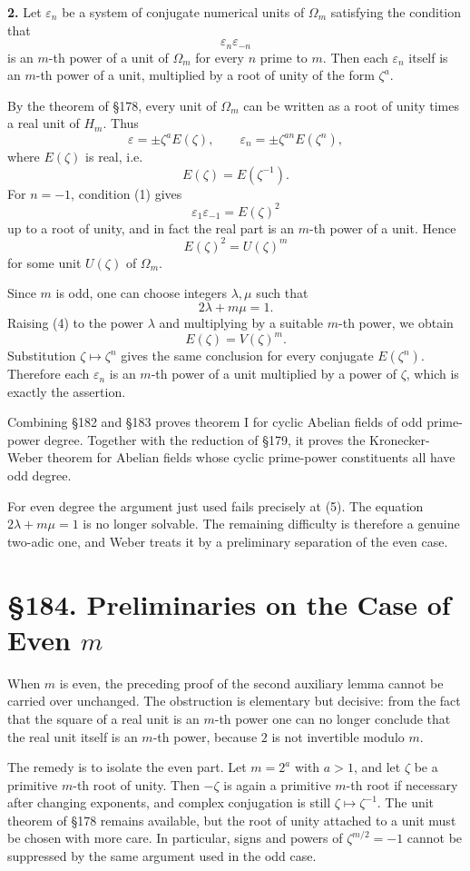 \documentclass[12pt,a4paper]{article}
\newcommand{\webersection}[2]{\clearpage\section*{\S #1. #2}}
\newcommand{\Om}{\Omega_m}
\newcommand{\Hm}{H_m}
\newcommand{\zetaS}{\zeta}
\begin{document}
\textbf{2.} Let \(\varepsilon_n\) be a system of conjugate numerical units of \(\Om\) satisfying the condition that
\[
  \varepsilon_n\varepsilon_{-n}
\tag{1}
\]
is an \(m\)-th power of a unit of \(\Om\) for every \(n\) prime to \(m\).  Then each \(\varepsilon_n\) itself is an \(m\)-th power of a unit, multiplied by a root of unity of the form \(\zetaS^a\).

By the theorem of \S178, every unit of \(\Om\) can be written as a root of unity times a real unit of \(\Hm\).  Thus
\[
  \varepsilon=\pm\zetaS^a E(\zetaS),
\qquad
  \varepsilon_n=\pm\zetaS^{an}E(\zetaS^n),
\tag{2}
\]
where \(E(\zetaS)\) is real, i.e.
\[
  E(\zetaS)=E(\zetaS^{-1}).
\tag{3}
\]
For \(n=-1\), condition (1) gives
\[
  \varepsilon_1\varepsilon_{-1}=E(\zetaS)^2
\]
up to a root of unity, and in fact the real part is an \(m\)-th power of a unit.  Hence
\[
  E(\zetaS)^2=U(\zetaS)^m
\tag{4}
\]
for some unit \(U(\zetaS)\) of \(\Om\).

Since \(m\) is odd, one can choose integers \(\lambda,\mu\) such that
\[
  2\lambda+m\mu=1.
\tag{5}
\]
Raising (4) to the power \(\lambda\) and multiplying by a suitable \(m\)-th power, we obtain
\[
  E(\zetaS)=V(\zetaS)^m.
\tag{6}
\]
Substitution \(\zetaS\mapsto\zetaS^n\) gives the same conclusion for every conjugate \(E(\zetaS^n)\).  Therefore each \(\varepsilon_n\) is an \(m\)-th power of a unit multiplied by a power of \(\zetaS\), which is exactly the assertion.

Combining \S182 and \S183 proves theorem I for cyclic Abelian fields of odd prime-power degree.  Together with the reduction of \S179, it proves the Kronecker-Weber theorem for Abelian fields whose cyclic prime-power constituents all have odd degree.

For even degree the argument just used fails precisely at (5).  The equation \(2\lambda+m\mu=1\) is no longer solvable.  The remaining difficulty is therefore a genuine two-adic one, and Weber treats it by a preliminary separation of the even case.

\webersection{184}{Preliminaries on the Case of Even \(m\)}

When \(m\) is even, the preceding proof of the second auxiliary lemma cannot be carried over unchanged.  The obstruction is elementary but decisive: from the fact that the square of a real unit is an \(m\)-th power one can no longer conclude that the real unit itself is an \(m\)-th power, because \(2\) is not invertible modulo \(m\).

The remedy is to isolate the even part.  Let \(m=2^a\) with \(a>1\), and let \(\zetaS\) be a primitive \(m\)-th root of unity.  Then \(-\zetaS\) is again a primitive \(m\)-th root if necessary after changing exponents, and complex conjugation is still \(\zetaS\mapsto\zetaS^{-1}\).  The unit theorem of \S178 remains available, but the root of unity attached to a unit must be chosen with more care.  In particular, signs and powers of \(\zetaS^{m/2}=-1\) cannot be suppressed by the same argument used in the odd case.
\end{document}
